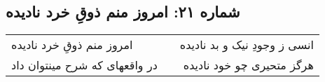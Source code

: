\begin{center}
\section*{شماره ۲۱: امروز منم ذوقِ خرد نادیده}
\label{sec:021}
\begin{longtable}{l p{0.5cm} r}
امروز منم ذوقِ خرد نادیده
&&
انسی ز وجودِ نیک و بد نادیده
\\
در واقعهای که شرح مینتوان داد
&&
هرگز متحیری چو خود نادیده
\\
\end{longtable}
\end{center}
